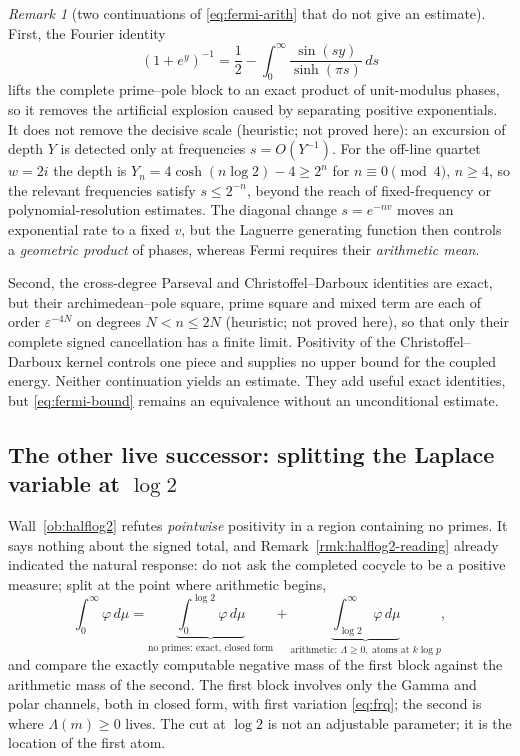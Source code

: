 \documentclass[11pt]{amsart}
\theoremstyle{definition}
\theoremstyle{remark}
\newtheorem{remark}[theorem]{Remark}
\theoremstyle{definition}
\begin{document}
\begin{remark}[two continuations of \eqref{eq:fermi-arith} that do not give an estimate]\label{rmk:fermi-continuations}
First, the
Fourier identity
\[
 (1+e^y)^{-1}=\frac12-\int_0^\infty\frac{\sin(sy)}{\sinh(\pi s)}\,ds
\]
lifts the complete prime--pole block to an exact product of unit-modulus phases, so it removes the
artificial explosion caused by separating positive exponentials.  It does not remove the decisive
scale (heuristic; not proved here): an excursion of depth $Y$ is detected only at frequencies
$s=O(Y^{-1})$.  For the off-line quartet $w=2i$ the depth is $Y_n=4\cosh(n\log2)-4\ge2^n$ for
$n\equiv0\pmod4$, $n\ge4$, so the relevant frequencies satisfy $s\le2^{-n}$, beyond the reach of
fixed-frequency or polynomial-resolution estimates.  The diagonal change $s=e^{-nv}$ moves an exponential rate to a
fixed $v$, but the Laguerre generating function then controls a \emph{geometric product} of phases,
whereas Fermi requires their \emph{arithmetic mean}.

Second, the cross-degree Parseval and Christoffel--Darboux identities are exact, but their
archimedean--pole square, prime square and mixed term are each of order
$\varepsilon^{-4N}$ on degrees $N<n\le2N$ (heuristic; not proved here), so that only their complete
signed cancellation has a finite limit.  Positivity of the Christoffel--Darboux kernel controls one
piece and supplies no upper bound for the coupled energy.  Neither continuation yields an estimate.
They add useful exact identities, but \eqref{eq:fermi-bound} remains an equivalence
without an unconditional estimate.
\end{remark}

\subsection{The other live successor: splitting the Laplace variable at $\log2$}
\label{sec:split}

Wall~\ref{ob:halflog2} refutes \emph{pointwise} positivity in a region containing no primes. It
says nothing about the signed total, and Remark~\ref{rmk:halflog2-reading} already indicated the
natural response: do not ask the completed cocycle to be a positive measure; split at the point
where arithmetic begins,
\begin{equation}\label{eq:split-log2}
   \int_0^\infty\varphi\,d\mu
   =\underbrace{\int_0^{\log2}\varphi\,d\mu}_{\text{no primes: exact, closed form}}
   +\underbrace{\int_{\log2}^\infty\varphi\,d\mu}_{\text{arithmetic: }\Lambda\ge0,\ \text{atoms at }k\log p} ,
\end{equation}
and compare the exactly computable negative mass of the first block against the arithmetic mass of
the second. The first block involves only the Gamma and polar channels, both in closed form, with
first variation \eqref{eq:frq}; the second is where $\Lambda(m)\ge0$ lives. The cut at $\log2$ is
not an adjustable parameter; it is the location of the first atom.
\end{document}
